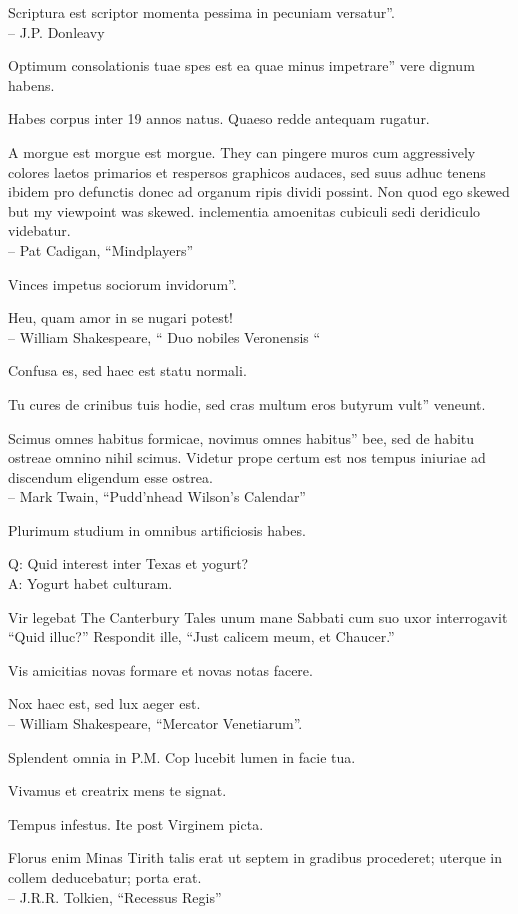 \documentclass[titlepage,12pt]{memoir}
\begin{document}
Scriptura est scriptor momenta pessima in pecuniam versatur”.
\\-- J.P. Donleavy

Optimum consolationis tuae spes est ea quae minus impetrare”
vere dignum habens.

Habes corpus inter 19 annos natus. Quaeso redde antequam rugatur.

A morgue est morgue est morgue. They can pingere muros cum aggressively
colores laetos primarios et respersos graphicos audaces, sed suus adhuc tenens
ibidem pro defunctis donec ad organum ripis dividi possint. Non quod ego
skewed but my viewpoint was skewed. inclementia
amoenitas cubiculi sedi deridiculo videbatur.
\\-- Pat Cadigan, “Mindplayers”

Vinces impetus sociorum invidorum”.

Heu, quam amor in se nugari potest!
\\-- William Shakespeare, “ Duo nobiles Veronensis “

Confusa es, sed haec est statu normali.

Tu cures de crinibus tuis hodie, sed cras multum eros butyrum vult”
veneunt.

Scimus omnes habitus formicae, novimus omnes habitus”
bee, sed de habitu ostreae omnino nihil scimus. Videtur
prope certum est nos tempus iniuriae ad discendum eligendum esse
ostrea.
\\-- Mark Twain, “Pudd’nhead Wilson’s Calendar”

Plurimum studium in omnibus artificiosis habes.

Q: Quid interest inter Texas et yogurt?\\
A: Yogurt habet culturam.

 Vir legebat The Canterbury Tales unum mane Sabbati cum suo
uxor interrogavit “Quid illuc?” Respondit ille, “Just calicem meum, et Chaucer.”

Vis amicitias novas formare et novas notas facere.

Nox haec est, sed lux aeger est.
\\-- William Shakespeare, “Mercator Venetiarum”.

Splendent omnia in P.M. Cop lucebit lumen in facie tua.

Vivamus et creatrix mens te signat.

Tempus infestus. Ite post Virginem picta.

Florus enim Minas Tirith talis erat ut septem in gradibus procederet;
uterque in collem deducebatur;
porta erat.
\\-- J.R.R. Tolkien, “Recessus Regis”
\end{document}
